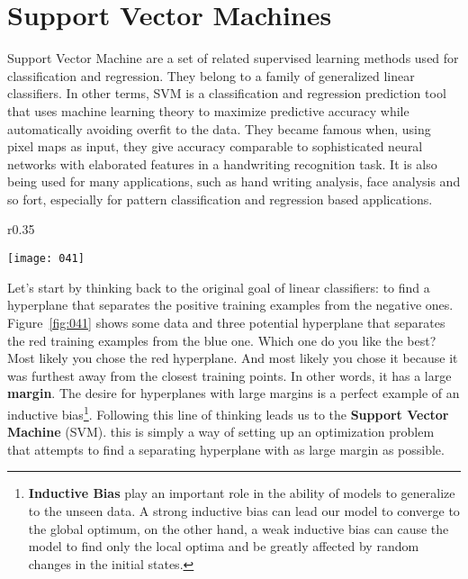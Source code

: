 \chapter{Support Vector Machines}

Support Vector Machine are a set of related supervised learning methods used for classification and regression. They belong to a family of generalized linear classifiers. In other terms, SVM is a classification and regression prediction tool that uses machine learning theory to maximize predictive accuracy while automatically avoiding overfit to the data. They became famous when, using pixel maps as input, they give accuracy comparable to sophisticated neural networks with elaborated features in a handwriting recognition task. It is also being used for many applications, such as hand writing analysis, face analysis and so fort, especially for pattern classification and regression based applications.

\begin{wrapfigure}{r}{0.35\textwidth}
    \begin{center}
        \texttt{[image: 041]}
        \caption{Possible hyperplanes for linearly-separable data that shows the best solution (red middle line) compared to other possible solutions.}
        \label{fig:041}
        \vspace*{-10pt}
    \end{center}
\end{wrapfigure}

Let's start by thinking back to the original goal of linear classifiers: to find a hyperplane that separates the positive training examples from the negative ones. Figure~\ref{fig:041} shows some data and three potential hyperplane that separates the red training examples from the blue one. Which one do you like the best? Most likely you chose the red hyperplane. And most likely you chose it because it was furthest away from the closest training points. In other words, it has a large \textbf{margin}. The desire for hyperplanes with large margins is a perfect example of an inductive bias\footnote{\textbf{Inductive Bias} play an important role in the ability of models to generalize to the unseen data. A strong inductive bias can lead our model to converge to the global optimum, on the other hand, a weak inductive bias can cause the model to find only the local optima and be greatly affected by random changes in the initial states.}. Following this line of thinking leads us to the \textbf{Support Vector Machine} (SVM). this is simply a way of setting up an optimization problem that attempts to find a separating hyperplane with as large margin as possible. 


